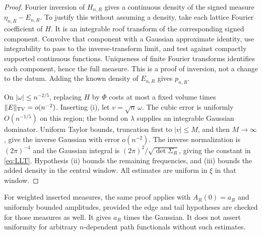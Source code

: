 \begin{proof}
Fourier inversion of $H_{n,R}$ gives a continuous density of the signed measure $\eta_{n,R}-E_{n,R}$. To justify this without assuming a density, take each lattice Fourier coefficient of $H$. It is an integrable roof transform of the corresponding signed component. Convolve that component with a Gaussian approximate identity, use integrability to pass to the inverse-transform limit, and test against compactly supported continuous functions. Uniqueness of finite Fourier transforms identifies each component, hence the full measure. This is a proof of inversion, not a change to the datum. Adding the known density of $E_{n,R}$ gives $p_{n,R}$.

On $|\omega|\le n^{-2/5}$, replacing $H$ by $\Phi$ costs at most a fixed volume times $\|E\|_{\operatorname{TV}}=o(n^{-2})$. Inserting (i), let $v=\sqrt n\,\omega$. The cubic error is uniformly $O(n^{-1/5})$ on this region; the bound on $\lambda$ supplies an integrable Gaussian dominator. Uniform Taylor bounds, truncation first to $|v|\le M$, and then $M\to\infty$, give the inverse Gaussian with error $o(n^{-2})$. The inverse normalization is $(2\pi)^{-4}$ and the Gaussian integral is $(2\pi)^2/\sqrt{\det\Sigma_R}$, giving the constant in \eqref{eq:LLT}. Hypothesis (ii) bounds the remaining frequencies, and (iii) bounds the added density in the central window. All estimates are uniform in $\xi$ in that window.
\end{proof}

For weighted inserted measures, the same proof applies with $A_R(0)=a_R$ and uniformly bounded amplitudes, provided the edge and tail hypotheses are checked for those measures as well. It gives $a_R$ times the Gaussian. It does not assert uniformity for arbitrary $n$-dependent path functionals without such estimates.

